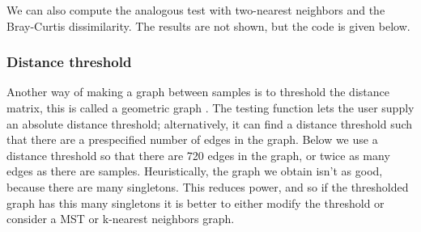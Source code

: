 We can also compute the analogous test with two-nearest neighbors and the
Bray-Curtis dissimilarity. The results are not shown, but the code is
given below.

\begin{knitrout}
\color{fgcolor}\begin{kframe}
\begin{alltt}
 \hlkwb{<-}  \hlstd{,}
                       \hlstd{=} \hlstd{,}
                       \hlstd{=} \hlstd{,}  \hlstd{=} \hlstd{,}  \hlstd{=} \hlstd{)}
\end{alltt}
\end{kframe}
\end{knitrout}

\begin{knitrout}
\color{fgcolor}\begin{kframe}
\begin{alltt}
\end{alltt}
\end{kframe}
\end{knitrout}

\subsubsection*{Distance threshold}

Another way of making a graph between samples is to threshold the
distance matrix, this is called a geometric graph \cite{Penrose2003}.
The testing function lets the user supply an absolute distance
threshold; alternatively, it can find a distance threshold
such that there are a prespecified number of edges in the graph. Below
we use a distance threshold so that there are 720 edges in the
graph, or twice as many edges as there are samples. Heuristically, the
graph we obtain isn't as good, because there are many singletons. This
reduces power, and so if the thresholded graph has this many
singletons it is better to either modify the threshold or consider a
MST or k-nearest neighbors graph.

\begin{knitrout}
\color{fgcolor}\begin{kframe}
\begin{alltt}
 \hlkwb{<-}  \hlstd{,}  \hlstd{=} \hlstd{,}
                       \hlstd{=} \hlstd{,}  \hlstd{=} \hlstd{,}  \hlstd{=} \hlstd{,}
                       \hlstd{=} \hlstd{)}
\end{alltt}
\end{kframe}
\end{knitrout}

